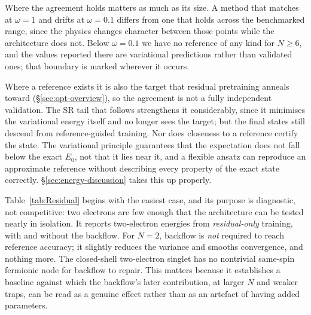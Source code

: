 Where the agreement holds matters as much as its size. A method that matches at $\omega=1$
and drifts at $\omega=0.1$ differs from one that holds across the benchmarked range, since
the physics changes character between those points while the architecture does not. Below
$\omega=0.1$ we have no reference of any kind for $N\ge6$, and the values reported there are
variational predictions rather than validated ones; that boundary is marked wherever it
occurs.

Where a reference exists it is also the target that residual pretraining anneals toward
(\S\ref{sec:opt-overview}), so the agreement is not a fully independent validation. The SR
tail that follows strengthens it considerably, since it minimises the variational energy
itself and no longer sees the target; but the final states still descend from
reference-guided training. Nor does closeness to a reference certify the state. The
variational principle guarantees that the expectation does not fall below the exact $E_0$,
not that it lies near it, and a flexible ansatz can reproduce an approximate reference
without describing every property of the exact state correctly.
\S\ref{sec:energy-discussion} takes this up properly.

Table~\ref{tab:Residual} begins with the easiest case, and its purpose is diagnostic, not competitive: two electrons are few enough that the
architecture can be tested nearly in isolation. It reports two-electron energies
from \emph{residual-only} training, with and without the backflow. For $N{=}2$, backflow is
\emph{not} required to reach reference accuracy;
it slightly reduces the variance and smooths convergence, and nothing more. The
closed-shell two-electron singlet has no nontrivial same-spin fermionic node for
backflow to repair. This
matters because it establishes a baseline against which the backflow's later
contribution, at larger $N$ and weaker traps, can be read as a genuine effect
rather than as an artefact of having added parameters.

